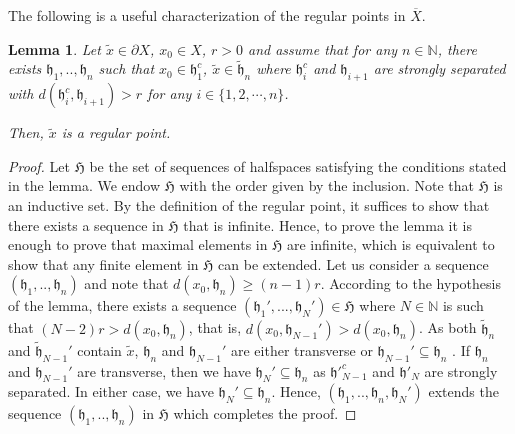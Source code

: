 \documentclass{amsart}
\numberwithin{equation}{section}
\newtheorem{lem}[thm]{Lemma}
\newcommand{\hh}{\mathfrak{h}}    %
\newcommand{\NN}{\mathbb{N}}      %
\theoremstyle{definition}
\def\bar{\overline}
\begin{document}
The following is a useful characterization of the regular points in $\bar X$.
\begin{lem}\label{lem_characterization_regular_points}
    Let $\tilde{x}\in \partial X$, $x_0\in X$, $r>0$ and assume that for any $n\in\NN$, there exists $\hh_1,..,\hh_n$ such that $x_0\in\hh_1^c$, $\tilde{x}\in\tilde{\hh}_n$ where $\hh_i^c$ and $\hh_{i+1}$ are strongly separated with $d(\hh_i^c,\hh_{i+1})>r$ for any $i\in\{1,2,\cdots,n\}$. \par 
    Then, $\tilde{x}$ is a regular point.
\end{lem}
\begin{proof}
    Let $\mathfrak{H}$ be the set of sequences of halfspaces satisfying the conditions stated in the lemma. We endow $\mathfrak{H}$ with the order given by the inclusion. Note that $\mathfrak{H}$ is an inductive set. By the definition of the regular point, it suffices to show that there exists a sequence in $\mathfrak{H}$ that is infinite. Hence, to prove the lemma it is enough to prove that maximal elements in $\mathfrak{H}$ are infinite, which is equivalent to show that any finite element in $\mathfrak{H}$ can be extended. Let us consider a sequence $(\hh_1,..,\hh_n)$ and note that $d(x_0,\hh_n)\geq (n-1)r$. According to the hypothesis of the lemma, there exists a sequence $(\hh_1',...,\hh_{N}')\in\mathfrak{H}$ where $N \in \NN$ is such that $(N-2)r>d(x_0,\hh_n)$, that is, $d(x_0,\hh_{N-1}')>d(x_0,\hh_n)$. As both $\tilde{\hh}_n$ and $\tilde{\hh}_{N-1}'$ contain $\tilde{x}$, $\hh_n$ and $\hh_{N-1}'$ are either transverse or $ \hh_{N-1}'\subseteq \hh_n$ . If $\hh_n$ and $\hh_{N-1}'$ are transverse, then we have $\hh_{N}'\subseteq \hh_n$ as $\hh'^c_{N-1}$ and $\hh'_{N}$ are strongly separated. In either case, we have $\hh_{N}'\subseteq \hh_n$. Hence, $(\hh_1,..,\hh_n,\hh_{N}')$ extends the sequence $(\hh_1,..,\hh_n)$ in $\mathfrak{H}$ which completes the proof.
\end{proof}
\end{document}
